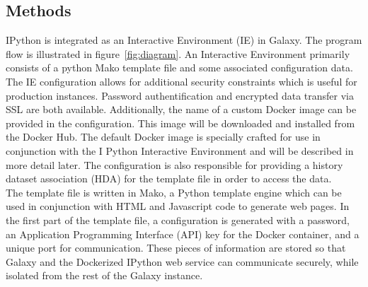 \documentclass{bioinfo}
\begin{document}
\begin{methods}
\section{Methods}

IPython is integrated as an Interactive Environment (IE) in Galaxy. The program flow is illustrated in 
figure~\ref{fig:diagram}. An Interactive Environment primarily consists of a python Mako template file and some
associated configuration data. The IE configuration allows for additional security constraints which is useful
for production instances. Password authentification and encrypted data transfer via SSL are both available.
Additionally, the name of a custom Docker image can be provided in the configuration. This image will be downloaded and 
installed from the Docker Hub. The default Docker image is specially crafted for use in conjunction with the I
Python Interactive Environment and will be described in more detail later. The configuration is also responsible for providing a history dataset 
association (HDA) for the template file in order to access the data. \\
The template file is written in Mako, a Python template engine which can be used in conjunction with HTML
and Javascript code to generate web pages. In the first part of the template file, a configuration is generated with a password, 
an Application Programming Interface (API) key for the Docker container, and a unique port for communication. These pieces of information are stored so that Galaxy
and the Dockerized IPython web service can communicate securely, while isolated from the rest of the Galaxy instance.


\end{methods}
\end{document}
